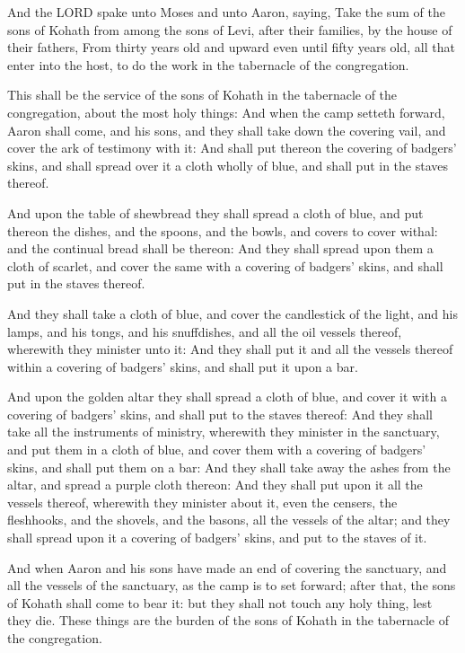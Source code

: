 \Chapter
\Verse And the LORD spake unto Moses and unto Aaron, saying, \Verse Take the
sum of the sons of Kohath from among the sons of Levi, after their
families, by the house of their fathers, \Verse From thirty years old and
upward even until fifty years old, all that enter into the host, to do
the work in the tabernacle of the congregation.

\Verse This shall be the service of the sons of Kohath in the tabernacle
of the congregation, about the most holy things: \Verse And when the camp
setteth forward, Aaron shall come, and his sons, and they shall take
down the covering vail, and cover the ark of testimony with it: \Verse
And shall put thereon the covering of badgers' skins, and shall spread
over it a cloth wholly of blue, and shall put in the staves thereof.

\Verse And upon the table of shewbread they shall spread a cloth of blue,
and put thereon the dishes, and the spoons, and the bowls, and covers
to cover withal: and the continual bread shall be thereon: \Verse And
they shall spread upon them a cloth of scarlet, and cover the same
with a covering of badgers' skins, and shall put in the staves
thereof.

\Verse And they shall take a cloth of blue, and cover the candlestick of
the light, and his lamps, and his tongs, and his snuffdishes, and all
the oil vessels thereof, wherewith they minister unto it: \Verse And
they shall put it and all the vessels thereof within a covering of
badgers' skins, and shall put it upon a bar.

\Verse And upon the golden altar they shall spread a cloth of blue, and
cover it with a covering of badgers' skins, and shall put to the
staves thereof: \Verse And they shall take all the instruments of
ministry, wherewith they minister in the sanctuary, and put them in a
cloth of blue, and cover them with a covering of badgers' skins, and
shall put them on a bar: \Verse And they shall take away the ashes from
the altar, and spread a purple cloth thereon: \Verse And they shall put
upon it all the vessels thereof, wherewith they minister about it,
even the censers, the fleshhooks, and the shovels, and the basons, all
the vessels of the altar; and they shall spread upon it a covering of
badgers' skins, and put to the staves of it.

\Verse And when Aaron and his sons have made an end of covering the
sanctuary, and all the vessels of the sanctuary, as the camp is to set
forward; after that, the sons of Kohath shall come to bear it: but
they shall not touch any holy thing, lest they die. These things are
the burden of the sons of Kohath in the tabernacle of the
congregation.


